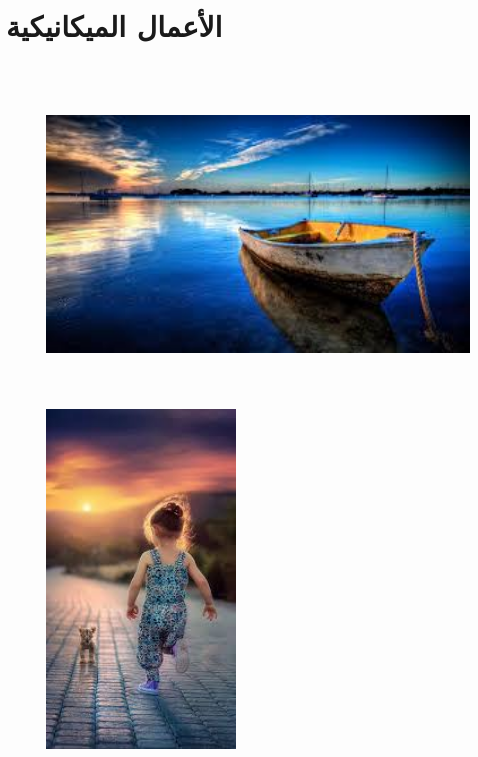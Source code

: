 \documentclass{article}
\begin{document}
\section{الأعمال الميكانيكية}
\begin{figure}[H]
    \centering

    \begin{minipage}{0.45\textwidth}
        \centering
        \includegraphics[height=9cm,width=\textwidth]{mech/1.jpg}
    \end{minipage}
    \hfill
    \begin{minipage}{0.45\textwidth}
        \centering
        \includegraphics[height=9cm,width=\textwidth]{mech/2.jpg}
    \end{minipage}
    \vspace{0.5cm} %


\end{figure}
\end{document}

